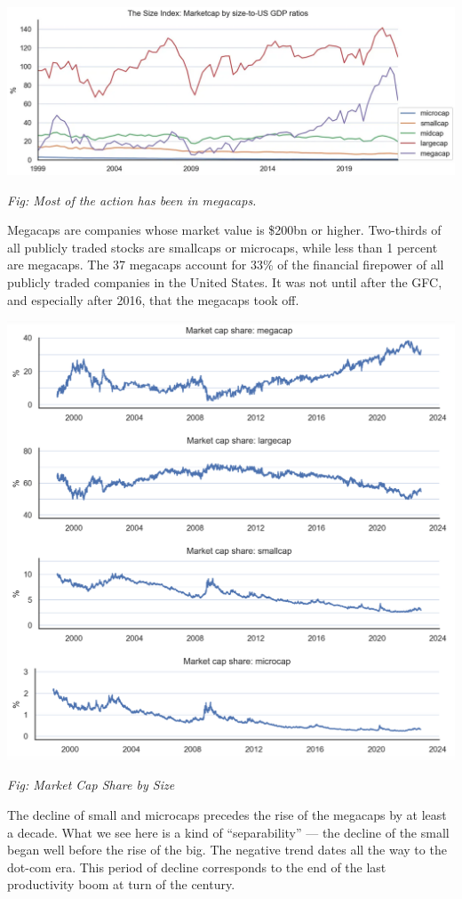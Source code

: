 \documentclass[
]{book}
\begin{document}
\includegraphics{fig/marketcap_gdp.png}

\emph{Fig: Most of the action has been in megacaps.}

Megacaps are companies whose market value is \$200bn or higher.
Two-thirds of all publicly traded stocks are smallcaps or microcaps, while less than 1 percent are megacaps.
The 37 megacaps account for 33\% of the financial firepower of all publicly traded companies in the United States.
It was not until after the GFC, and especially after 2016, that the megacaps took off.

\includegraphics{fig/market_cap_by_size.png}

\emph{Fig: Market Cap Share by Size}

The decline of small and microcaps precedes the rise of the megacaps by at least a decade. What we see here is a kind of ``separability'' --- the decline of the small began well before the rise of the big.
The negative trend dates all the way to the dot-com era.
This period of decline corresponds to the end of the last productivity boom at turn of the century.
\end{document}
